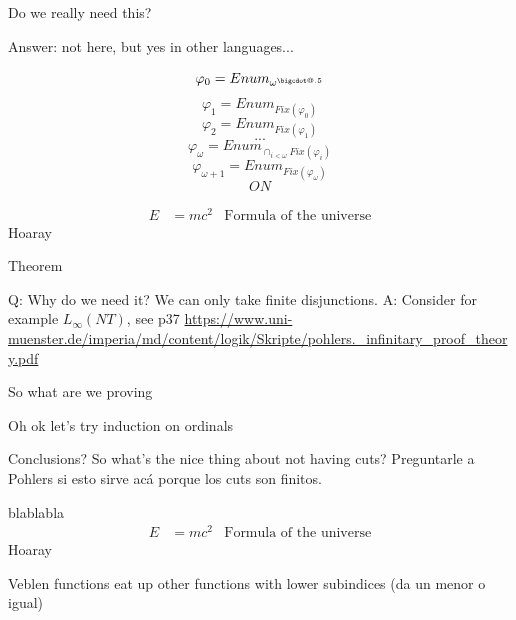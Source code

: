 \documentclass[10pt]{beamer}
\makeatletter
\newcommand*\bigcdot{\mathpalette\bigcdot@{.5}}
\newcommand*\bigcdot@[2]{\mathbin{\vcenter{\hbox{\scalebox{#2}{$\m@th#1\bullet$}}}}}
\def\fomega{{\omega}^{\bigcdot}}
\makeatother
\begin{document}
\begin{frame}
\begin{tcolorbox}
Do we really need this?
\end{tcolorbox}

Answer: not here, but yes in other languages...
\end{frame}

\begin{frame}
	$$\varphi_0 = Enum_{\fomega}$$
	$$\varphi_1 = Enum_{Fix(\varphi_0)}$$
	$$\varphi_2 = Enum_{Fix(\varphi_1)}$$
	$$...$$
	$$\varphi_\omega = Enum_{ \displaystyle \cap_{i < \omega} Fix(\varphi_i)}$$
	$$\varphi_{\omega+1} = Enum_{Fix(\varphi_\omega)}$$
	$$ON$$
\end{frame}



\begin{frame}
\begin{tcolorbox}
\begin{align}
E &= mc^2 & \text{Formula of the universe}
\end{align}
Hoaray
\end{tcolorbox}

\end{frame}

\begin{frame}
	Theorem
\end{frame}

Q: Why do we need it? We can only take finite disjunctions.
A: Consider for example $L_\infty(NT)$, see p37 \url{https://www.uni-muenster.de/imperia/md/content/logik/Skripte/pohlers._infinitary_proof_theory.pdf}


\begin{frame}
	So what are we proving
\end{frame}

\begin{frame}
	Oh ok let's try induction on ordinals
\end{frame}

\begin{frame}
	Conclusions? So what's the nice thing about not having cuts?
	Preguntarle a Pohlers si esto sirve acá porque los cuts son finitos.
\end{frame}


\begin{frame}
\begin{tcolorbox}
blablabla
\begin{align}
E &= mc^2 & \text{Formula of the universe}
\end{align}
Hoaray
\end{tcolorbox}
\end{frame}

Veblen functions eat up other functions with lower subindices (da un menor o igual)
\fi
\end{document}
